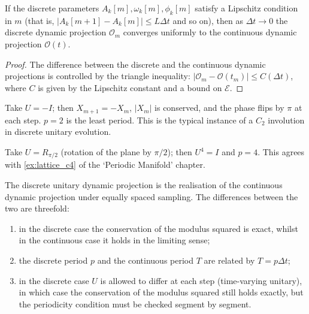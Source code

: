 \begin{proposition}\label{prop:dyn_discrete_projection_continuity}
If the discrete parameters $A_k[m],\omega_k[m],\phi_k[m]$ satisfy a Lipschitz condition in $m$ (that is, $|A_k[m+1]-A_k[m]|\le L\Delta t$ and so on), then as $\Delta t\to 0$ the discrete dynamic projection $\mathcal O_m$ converges uniformly to the continuous dynamic projection $\mathcal O(t)$.
\end{proposition}

\begin{proof}
The difference between the discrete and the continuous dynamic projections is controlled by the triangle inequality: $|\mathcal O_m-\mathcal O(t_m)|\le C(\Delta t)$, where $C$ is given by the Lipschitz constant and a bound on $\mathcal E$.
\end{proof}

\begin{example}\label{ex:dyn_discrete_c2}
Take $U=-I$; then $X_{m+1}=-X_m$, $|X_m|$ is conserved, and the phase flips by $\pi$ at each step. $p=2$ is the least period. This is the typical instance of a $C_2$ involution in discrete unitary evolution.
\end{example}

\begin{example}\label{ex:dyn_discrete_c4}
Take $U=R_{\pi/2}$ (rotation of the plane by $\pi/2$); then $U^4=I$ and $p=4$. This agrees with \cref{ex:lattice_c4} of the `Periodic Manifold' chapter.
\end{example}

\begin{remark}\label{rem:dyn_discrete_vs_continuous}
The discrete unitary dynamic projection is the realisation of the continuous dynamic projection under equally spaced sampling. The differences between the two are threefold:
\begin{enumerate}[label=(\roman*)]
    \item in the discrete case the conservation of the modulus squared is exact, whilst in the continuous case it holds in the limiting sense;
    \item the discrete period $p$ and the continuous period $T$ are related by $T=p\Delta t$;
    \item in the discrete case $U$ is allowed to differ at each step (time-varying unitary), in which case the conservation of the modulus squared still holds exactly, but the periodicity condition must be checked segment by segment.
\end{enumerate}
\end{remark}

